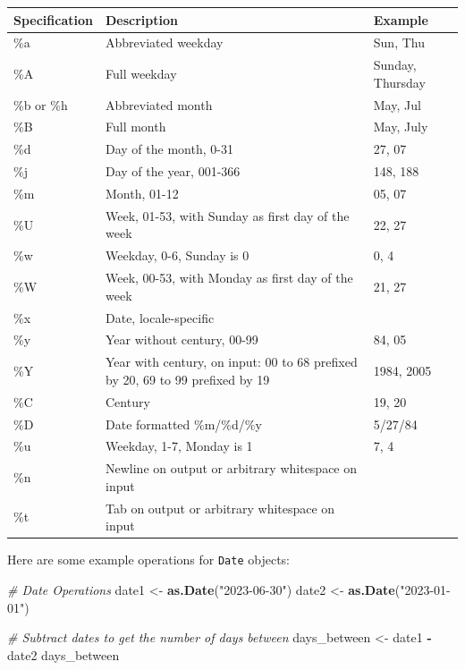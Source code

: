\documentclass[
]{book}
\newenvironment{Shaded}{\begin{snugshade}}{\end{snugshade}}
\newcommand{\CommentTok}[1]{\textcolor[rgb]{0.56,0.35,0.01}{\textit{#1}}}
\newcommand{\FunctionTok}[1]{\textcolor[rgb]{0.13,0.29,0.53}{\textbf{#1}}}
\newcommand{\NormalTok}[1]{#1}
\newcommand{\OtherTok}[1]{\textcolor[rgb]{0.56,0.35,0.01}{#1}}
\newcommand{\SpecialCharTok}[1]{\textcolor[rgb]{0.81,0.36,0.00}{\textbf{#1}}}
\newcommand{\StringTok}[1]{\textcolor[rgb]{0.31,0.60,0.02}{#1}}
\begin{document}
\begin{tabular}{l|l|l}
\hline
Specification & Description & Example\\
\hline
\%a & Abbreviated weekday & Sun, Thu\\
\hline
\%A & Full weekday & Sunday, Thursday\\
\hline
\%b or \%h & Abbreviated month & May, Jul\\
\hline
\%B & Full month & May, July\\
\hline
\%d & Day of the month, 0-31 & 27, 07\\
\hline
\%j & Day of the year, 001-366 & 148, 188\\
\hline
\%m & Month, 01-12 & 05, 07\\
\hline
\%U & Week, 01-53, with Sunday as first day of the week & 22, 27\\
\hline
\%w & Weekday, 0-6, Sunday is 0 & 0, 4\\
\hline
\%W & Week, 00-53, with Monday as first day of the week & 21, 27\\
\hline
\%x & Date, locale-specific & \\
\hline
\%y & Year without century, 00-99 & 84, 05\\
\hline
\%Y & Year with century, on input: 00 to 68 prefixed by 20, 69 to 99 prefixed by 19 & 1984, 2005\\
\hline
\%C & Century & 19, 20\\
\hline
\%D & Date formatted \%m/\%d/\%y & 5/27/84\\
\hline
\%u & Weekday, 1-7, Monday is 1 & 7, 4\\
\hline
\%n & Newline on output or arbitrary whitespace on input & \\
\hline
\%t & Tab on output or arbitrary whitespace on input & \\
\hline
\end{tabular}

Here are some example operations for \texttt{Date} objects:

\begin{Shaded}
\begin{Highlighting}[]
\CommentTok{\# Date Operations}
\NormalTok{date1 }\OtherTok{\textless{}{-}} \FunctionTok{as.Date}\NormalTok{(}\StringTok{"2023{-}06{-}30"}\NormalTok{)}
\NormalTok{date2 }\OtherTok{\textless{}{-}} \FunctionTok{as.Date}\NormalTok{(}\StringTok{"2023{-}01{-}01"}\NormalTok{)}

\CommentTok{\# Subtract dates to get the number of days between}
\NormalTok{days\_between }\OtherTok{\textless{}{-}}\NormalTok{ date1 }\SpecialCharTok{{-}}\NormalTok{ date2}
\NormalTok{days\_between}
\end{Highlighting}
\end{Shaded}
\end{document}
